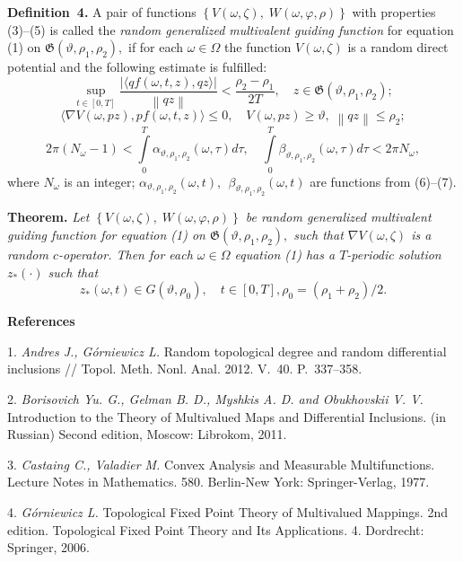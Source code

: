 \textbf{Definition~4.} A pair of functions $\left\{ {V(\omega,\zeta),\;W(\omega,\varphi,\rho )} \right\}$ with properties (3)--(5) is called the {\it random generalized multiva\-lent guiding function} for equation (1) on $\mathfrak{G}\left({\vartheta ,\rho _{1} ,\rho _{2} } \right),$ if for each $\omega\in\Omega$ the function $V(\omega,\zeta)$ is a random direct potential and the following estimate is fulfilled:
$$
\mathop {\sup}\limits_{t \in \left[ {0,T} \right]}\frac{{\left| {\langle {qf(\omega,t,z),qz} \rangle} \right|}}{{\left\|{qz} \right\|}} < \frac{{\rho _{2} - \rho _{1} }}{{2T}},\quad z\in \mathfrak{G} (\vartheta ,\rho _{1} ,\rho _{2} );
$$
$$
\langle\nabla V(\omega,pz),pf(\omega,t,z)\rangle \le 0,\quad V(\omega,pz) \ge \vartheta ,\;\left\| {qz} \right\| \le \rho _{2};
$$
$$
2\pi (N_{\omega} - 1) < \int\limits_{0}^{T} {\alpha_{\vartheta ,\rho _{1} ,\rho _{2} } (\omega,\tau )d\tau } , \quad
\int\limits_{0}^{T} {\beta _{\vartheta ,\rho _{1} ,\rho _{2} } (\omega,\tau )d\tau < 2\pi N_{\omega}},
$$
where $N_{\omega}$ is an integer; $\alpha _{\vartheta ,\rho_{1} ,\rho _{2} } (\omega,t),\,\;\beta _{\vartheta ,\rho _{1} ,\rho _{2}} (\omega,t)$ are functions from  (6)--(7).

\textbf{Theorem.} {\it Let $\left\{ {V(\omega,\zeta),\;W(\omega,\varphi,\rho )} \right\}$ be random generalized multivalent guiding function for equation (1) on $\mathfrak{G}\left({\vartheta ,\rho _{1} ,\rho _{2} } \right),$ such that $\nabla V(\omega,\zeta)$ is a random $c$-operator. Then for each $\omega\in\Omega$ equation (1) has a $T$-periodic solution $z_{ * } ( \cdot )$  such that
$$
z_{ * } (\omega,t) \in G(\vartheta,\rho _{0}),\quad t \in [0,T], \rho _{0} = \left( {\rho _{1} + \rho _{2} } \right)/2.
$$}
\smallskip \centerline{\bf References}\nopagebreak

1. {\it Andres J., G\'orniewicz L.} Random topological degree and random differential inclusions // Topol. Meth. Nonl. Anal. 2012. V.\, 40. P.\, 337--358.

2. {\it Borisovich Yu. G., Gelman B. D., Myshkis A. D. and Obukhovskii V. V.} Introduction to the Theory of Multivalued Maps and Differential Inclusions. (in Russian) Second edition, Moscow: Librokom, 2011.

3. {\it Castaing C., Valadier M.} Convex Analysis and Measurable Multifunctions. Lecture Notes in Mathematics. 580. Berlin-New York: Springer-Verlag, 1977.

4. {\it G\'{o}rniewicz L.} Topological Fixed Point Theory of Multi\-valued Mappings. 2nd edition. Topological Fixed Point Theory and Its Applications. 4. Dordrecht: Springer, 2006.

